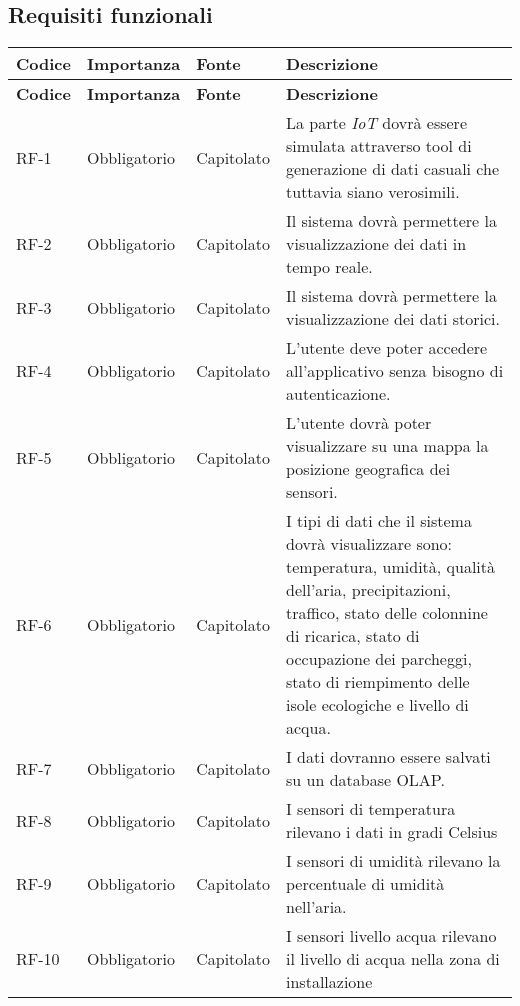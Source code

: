 \subsection{Requisiti funzionali}
\begin{longtable}{|>{\centering\arraybackslash}m{}|>{\centering\arraybackslash}m{}|>{\centering\arraybackslash}m{}|>{\centering\arraybackslash}m{}|}
	\hline
	\textbf{Codice} & \textbf{Importanza} & \textbf{Fonte} & \textbf{Descrizione}\\\hline
	\endfirsthead
	\hline
	\textbf{Codice} & \textbf{Importanza} & \textbf{Fonte} & \textbf{Descrizione}\\\hline
	\endhead
	\hline
	RF-1            & Obbligatorio        & Capitolato     & La parte \textit{IoT} dovrà essere simulata attraverso tool di generazione di dati casuali che tuttavia siano verosimili.
	\\\hline
	RF-2            & Obbligatorio        & Capitolato     & Il sistema dovrà permettere la visualizzazione dei dati in tempo reale.
	\\\hline
	RF-3            & Obbligatorio        & Capitolato     & Il sistema dovrà permettere la visualizzazione dei dati storici.
	\\\hline
	RF-4            & Obbligatorio        & Capitolato     & L'utente deve poter accedere all'applicativo senza bisogno di autenticazione.\\\hline
	RF-5            & Obbligatorio        & Capitolato     & L'utente dovrà poter visualizzare su una mappa la posizione geografica dei sensori.
	\\\hline
	RF-6            & Obbligatorio        & Capitolato     & I tipi di dati che il sistema dovrà visualizzare sono: temperatura, umidità, qualità dell'aria, precipitazioni, traffico, stato delle colonnine di ricarica, stato di occupazione dei parcheggi, stato di riempimento delle isole ecologiche e livello di acqua.
	\\\hline
	RF-7            & Obbligatorio        & Capitolato     & I dati dovranno essere salvati su un database OLAP.
	\\\hline
	RF-8            & Obbligatorio        & Capitolato     & I sensori di temperatura rilevano i dati in gradi Celsius
	\\\hline
	RF-9            & Obbligatorio        & Capitolato     & I sensori di umidità rilevano la percentuale di umidità nell’aria.
	\\\hline
	RF-10           & Obbligatorio        & Capitolato     & I sensori livello acqua rilevano il livello di acqua nella zona di installazione

\end{longtable}

